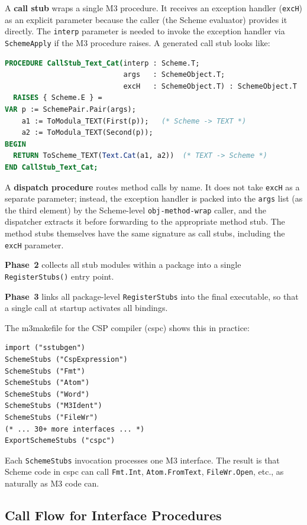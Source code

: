 \documentclass[11pt]{article}
\begin{document}
A \textbf{call stub} wraps a single M3 procedure.  It receives an
exception handler (\texttt{excH}) as an explicit parameter because the
caller (the Scheme evaluator) provides it directly.  The
\texttt{interp} parameter is needed to invoke the exception handler
via \texttt{SchemeApply} if the M3 procedure raises.  A generated call
stub looks like:

\begin{lstlisting}[language=Modula3]
PROCEDURE CallStub_Text_Cat(interp : Scheme.T;
                            args   : SchemeObject.T;
                            excH   : SchemeObject.T) : SchemeObject.T
  RAISES { Scheme.E } =
VAR p := SchemePair.Pair(args);
    a1 := ToModula_TEXT(First(p));   (* Scheme -> TEXT *)
    a2 := ToModula_TEXT(Second(p));
BEGIN
  RETURN ToScheme_TEXT(Text.Cat(a1, a2))  (* TEXT -> Scheme *)
END CallStub_Text_Cat;
\end{lstlisting}

A \textbf{dispatch procedure} routes method calls by name.  It does
not take \texttt{excH} as a separate parameter; instead, the exception
handler is packed into the \texttt{args} list (as the third element)
by the Scheme-level \texttt{obj-method-wrap} caller, and the
dispatcher extracts it before forwarding to the appropriate method
stub.  The method stubs themselves have the same signature as call
stubs, including the \texttt{excH} parameter.

\textbf{Phase~2} collects all stub modules within a package into a
single \texttt{RegisterStubs()} entry point.

\textbf{Phase~3} links all package-level \texttt{RegisterStubs} into
the final executable, so that a single call at startup activates all
bindings.

The m3makefile for the CSP compiler (cspc) shows this in practice:

\begin{lstlisting}[language={}]
import ("sstubgen")
SchemeStubs ("CspExpression")
SchemeStubs ("Fmt")
SchemeStubs ("Atom")
SchemeStubs ("Word")
SchemeStubs ("M3Ident")
SchemeStubs ("FileWr")
(* ... 30+ more interfaces ... *)
ExportSchemeStubs ("cspc")
\end{lstlisting}

Each \texttt{SchemeStubs} invocation processes one M3 interface.  The
result is that Scheme code in cspc can call \texttt{Fmt.Int},
\texttt{Atom.FromText}, \texttt{FileWr.Open}, etc., as naturally as
M3 code can.


\subsection{Call Flow for Interface Procedures}
\label{sec:call-flow}
\end{document}

